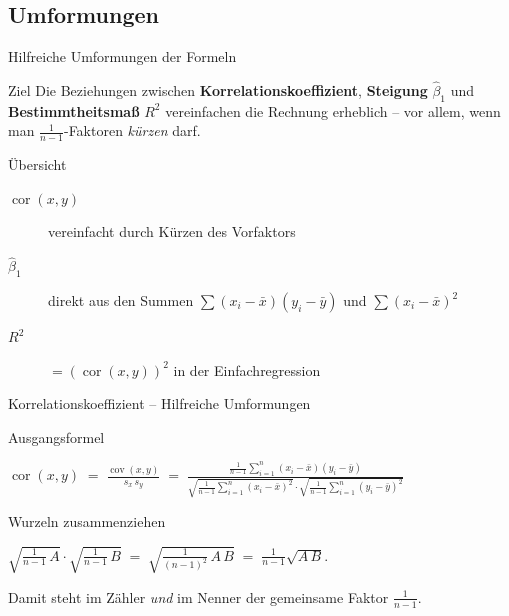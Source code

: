 \documentclass[aspectratio=169,11pt]{beamer}
\begin{document}
\subsection{Umformungen}

\begin{frame}{Hilfreiche Umformungen der Formeln}
  \begin{block}{Ziel}
    Die Beziehungen zwischen \textbf{Korrelationskoeffizient},
    \textbf{Steigung} $\hat{\beta}_1$ und \textbf{Bestimmtheitsmaß}
    $R^{2}$ vereinfachen die Rechnung erheblich -- vor allem, wenn
    man $\tfrac{1}{n-1}$-Faktoren \emph{kürzen} darf.
  \end{block}

  \begin{exampleblock}{Übersicht}
    \begin{description}
      \item[$\operatorname{cor}(x,y)$] vereinfacht durch Kürzen des Vorfaktors
      \item[$\hat{\beta}_1$] direkt aus den Summen $\sum (x_i-\bar{x})(y_i-\bar{y})$ und $\sum (x_i-\bar{x})^{2}$
      \item[$R^{2}$] $= (\operatorname{cor}(x,y))^{2}$ in der Einfachregression
    \end{description}
  \end{exampleblock}
\end{frame}

\begin{frame}{Korrelationskoeffizient -- Hilfreiche Umformungen}
  \begin{block}{Ausgangsformel}
    \begin{center}
      $\displaystyle
        \operatorname{cor}(x,y) \;=\; \frac{\operatorname{cov}(x,y)}{s_x\,s_y}
        \;=\; \frac{\tfrac{1}{n-1}\sum_{i=1}^{n}(x_i-\bar{x})(y_i-\bar{y})}
                    {\sqrt{\tfrac{1}{n-1}\sum_{i=1}^{n}(x_i-\bar{x})^{2}}
                     \cdot
                     \sqrt{\tfrac{1}{n-1}\sum_{i=1}^{n}(y_i-\bar{y})^{2}}}$
    \end{center}
  \end{block}

  \begin{exampleblock}{Wurzeln zusammenziehen}
    \begin{center}
      $\displaystyle
        \sqrt{\tfrac{1}{n-1}\,A} \cdot \sqrt{\tfrac{1}{n-1}\,B}
        \;=\; \sqrt{\tfrac{1}{(n-1)^{2}}\,A\,B}
        \;=\; \tfrac{1}{n-1}\sqrt{A\,B}.$
    \end{center}
    Damit steht im Zähler \emph{und} im Nenner der gemeinsame Faktor
    $\tfrac{1}{n-1}$.
  \end{exampleblock}
\end{frame}
\end{document}
